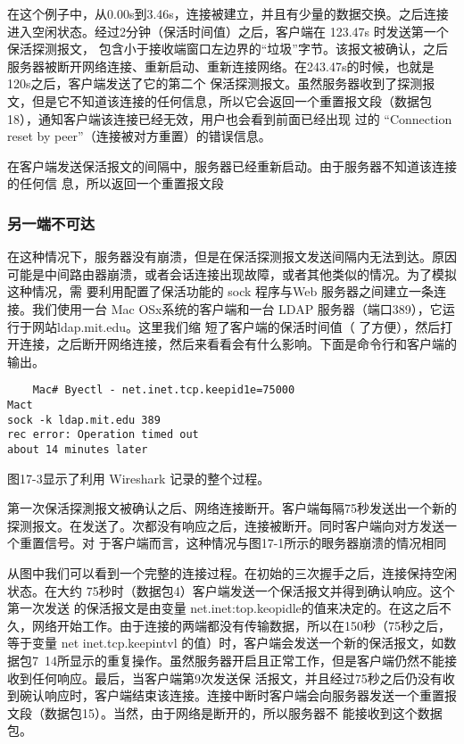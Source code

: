 在这个例子中，从0.00s到3.46s，连接被建立，并且有少量的数据交换。之后连接进入空闲状态。经过2分钟（保活时间值）之后，客户端在 123.47s 时发送第一个保活探测报文，
包含小于接收端窗口左边界的“垃圾”字节。该报文被确认，之后服务器被断开网络连接、重新启动、重新连接网络。在243.47s的时候，也就是120s之后，客户端发送了它的第二个
保活探测报文。虽然服务器收到了探测报文，但是它不知道该连接的任何信息，所以它会返回一个重置报文段（数据包18），通知客户端该连接已经无效，用户也会看到前面已经出现
过的 “Connection reset by peer”（连接被对方重置）的错误信息。

在客户端发送保活报文的间隔中，服务器已经重新启动。由于服务器不知道该连接的任何信
息，所以返回一个重置报文段

\subsubsection{另一端不可达}
在这种情况下，服务器没有崩溃，但是在保活探测报文发送间隔内无法到达。原因可能是中间路由器崩溃，或者会话连接出现故障，或者其他类似的情况。为了模拟这种情况，需
要利用配置了保活功能的 sock 程序与Web 服务器之间建立一条连接。我们使用一台 Mac OSx系统的客户端和一台 LDAP 服务器（端口389），它运行于网站ldap.mit.edu。这里我们缩
短了客户端的保活时间值（ 了方便），然后打开连接，之后断开网络连接，然后来看看会有什么影响。下面是命令行和客户端的输出。

\begin{verbatim}
    Mac# Byectl - net.inet.tcp.keepid1e=75000
Mact
sock -k ldap.mit.edu 389
rec error: Operation timed out
about 14 minutes later
\end{verbatim}

图17-3显示了利用 Wireshark 记录的整个过程。

第一次保活探測报文被确认之后、网络连接断开。客户端每隔75秒发送出一个新的探测报文。在发送了。次都没有响应之后，连接被断开。同时客户端向对方发送一个重置信号。对
于客户端而言，这种情况与图17-1所示的眼务器崩溃的情况相同

从图中我们可以看到一个完整的连接过程。在初始的三次握手之后，连接保持空闲状态。在大约 75秒时（数据包4）客户端发送一个保活报文并得到确认响应。这个第一次发送
的保活报文是由变量 net.inet:top.keopidle的值来决定的。在这之后不久，网络开始工作。由于连接的两端都没有传输数据，所以在150秒（75秒之后，等于变量 net inet.tcp.keepintvl
的值）时，客户端会发送一个新的保活报文，如数据包7~14所显示的重复操作。虽然服务器开启且正常工作，但是客户端仍然不能接收到任何响应。最后，当客户端第9次发送保
活报文，并且经过75秒之后仍没有收到碗认响应时，客户端结束该连接。连接中断时客户端会向服务器发送一个重置报文段（数据包15）。当然，由于网络是断开的，所以服务器不
能接收到这个数据包。

